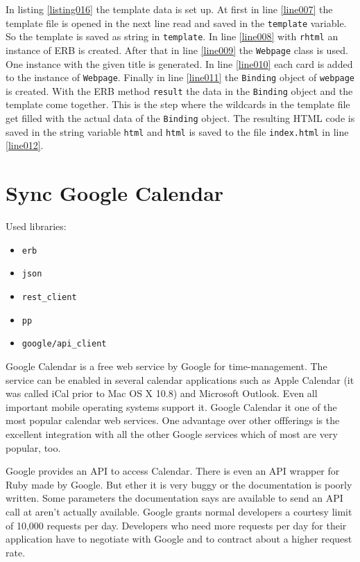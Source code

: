 In listing \ref{listing016} the template data is set up. At first in line \ref{line007} the template file is opened in the next line read and saved in the \lstinline{template} variable. So the template is saved as string in \lstinline{template}. In line \ref{line008} with \lstinline{rhtml} an instance of ERB is created. After that in line \ref{line009} the \lstinline{Webpage} class is used. One instance with the given title is generated. In line \ref{line010} each card is added to the instance of \lstinline{Webpage}. Finally in line \ref{line011} the \lstinline{Binding} object of \lstinline{webpage} is created. With the ERB method \lstinline{result} the data in the \lstinline{Binding} object and the template come together. This is the step where the wildcards in the template file get filled with the actual data of the \lstinline{Binding} object. The resulting HTML code is saved in the string variable \lstinline{html} and \lstinline{html} is saved to the file \texttt{index.html} in line \ref{line012}. 

\section{Sync Google Calendar}
Used libraries:
\begin{itemize}
	\item \texttt{erb}
	\item \texttt{json}
	\item \texttt{rest\_client}
	\item \texttt{pp}
	\item \texttt{google/api\_client}
\end{itemize}

Google Calendar is a free web service by Google for time-management. The service can be enabled in several calendar applications such as Apple Calendar (it was called iCal prior to Mac OS X 10.8) and Microsoft Outlook. Even all important mobile operating systems support it. Google Calendar it one of the most popular calendar web services. One advantage over other offferings is the excellent integration with all the other Google services which of most are very popular, too.

Google provides an API to access Calendar. There is even an API wrapper for Ruby made by Google. But ether it is very buggy or the documentation is poorly written. Some parameters the documentation says are available to send an API call at aren't actually available. Google grants normal developers a courtesy limit of 10,000 requests per day. Developers who need more requests per day for their application have to negotiate with Google and to contract about a higher request rate.


